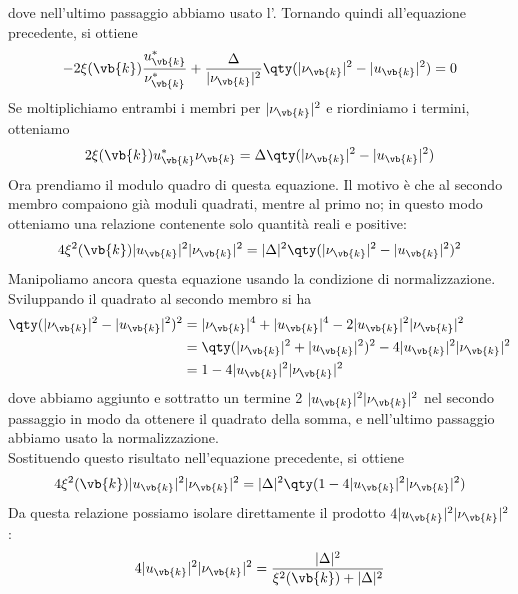 dove nell'ultimo passaggio abbiamo usato l'. Tornando quindi all'equazione precedente, si ottiene
\begin{equation*}
   -2\xi(\vb{k}) \frac{u_{\vb{k}}^*}{\nu_{\vb{k}}^*}
   + \frac{\Delta}{|\nu_{\vb{k}}|^2} \qty( |\nu_{\vb{k}}|^2 - |u_{\vb{k}}|^2 )
   =0
\end{equation*}
Se moltiplichiamo entrambi i membri per $|\nu_{\vb{k}}|^2$ e riordiniamo i termini, otteniamo
\begin{equation}
   2\xi(\vb{k}) u_{\vb{k}}^* \nu_{\vb{k}}
   = \Delta \qty( |\nu_{\vb{k}}|^2 - |u_{\vb{k}}|^2 )
   \label{eq:BCS_intermediate_equation}
\end{equation}
Ora prendiamo il modulo quadro di questa equazione. Il motivo è che al secondo membro compaiono già moduli quadrati, mentre al primo no; in questo modo otteniamo una relazione contenente solo quantità reali e positive:
\begin{equation*}
   4 \xi^2(\vb{k}) |u_{\vb{k}}|^2 |\nu_{\vb{k}}|^2
   = |\Delta|^2 \qty( |\nu_{\vb{k}}|^2 - |u_{\vb{k}}|^2 )^2
\end{equation*}
Manipoliamo ancora questa equazione usando la condizione di normalizzazione. Sviluppando il quadrato al secondo membro si ha
\begin{equation*}
   \begin{split}
      \qty( |\nu_{\vb{k}}|^2 - |u_{\vb{k}}|^2 )^2
      & = |\nu_{\vb{k}}|^4 + |u_{\vb{k}}|^4 - 2 |u_{\vb{k}}|^2 |\nu_{\vb{k}}|^2
      \\
      & = \qty( |\nu_{\vb{k}}|^2 + |u_{\vb{k}}|^2 )^2 - 4 |u_{\vb{k}}|^2 |\nu_{\vb{k}}|^2
      \\
      & = 1 - 4 |u_{\vb{k}}|^2 |\nu_{\vb{k}}|^2
   \end{split}
\end{equation*}
dove abbiamo aggiunto e sottratto un termine 2 $|u_{\vb{k}}|^2 |\nu_{\vb{k}}|^2$ nel secondo passaggio in modo da ottenere il quadrato della somma, e nell'ultimo passaggio abbiamo usato la normalizzazione.\\
Sostituendo questo risultato nell'equazione precedente, si ottiene
\begin{equation*}
   4 \xi^2(\vb{k}) |u_{\vb{k}}|^2 |\nu_{\vb{k}}|^2
   = |\Delta|^2 \qty( 1 - 4 |u_{\vb{k}}|^2 |\nu_{\vb{k}}|^2 )
\end{equation*}
Da questa relazione possiamo isolare direttamente il prodotto $4|u_{\vb{k}}|^2|\nu_{\vb{k}}|^2$:
\begin{equation*}
   4 |u_{\vb{k}}|^2 |\nu_{\vb{k}}|^2
   =\frac{|\Delta|^2}{\xi^2(\vb{k}) + |\Delta|^2}
\end{equation*}
